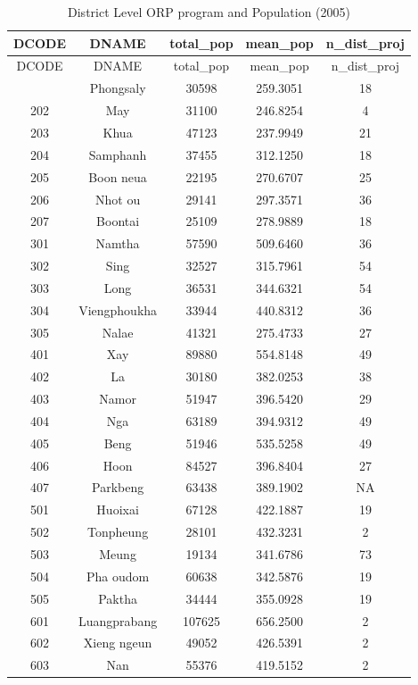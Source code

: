\documentclass[
  letterpaper,
  DIV=11,
  numbers=noendperiod]{scrartcl}
\begin{document}
\begin{longtable}[]{@{}ccccc@{}}
\caption{District Level ORP program and Population
(2005)}\tabularnewline
\toprule\noalign{}
DCODE & DNAME & total\_pop & mean\_pop & n\_dist\_proj \\
\midrule\noalign{}
\endfirsthead
\toprule\noalign{}
DCODE & DNAME & total\_pop & mean\_pop & n\_dist\_proj \\
\midrule\noalign{}
\endhead
\bottomrule\noalign{}
\endlastfoot
201 & Phongsaly & 30598 & 259.3051 & 18 \\
202 & May & 31100 & 246.8254 & 4 \\
203 & Khua & 47123 & 237.9949 & 21 \\
204 & Samphanh & 37455 & 312.1250 & 18 \\
205 & Boon neua & 22195 & 270.6707 & 25 \\
206 & Nhot ou & 29141 & 297.3571 & 36 \\
207 & Boontai & 25109 & 278.9889 & 18 \\
301 & Namtha & 57590 & 509.6460 & 36 \\
302 & Sing & 32527 & 315.7961 & 54 \\
303 & Long & 36531 & 344.6321 & 54 \\
304 & Viengphoukha & 33944 & 440.8312 & 36 \\
305 & Nalae & 41321 & 275.4733 & 27 \\
401 & Xay & 89880 & 554.8148 & 49 \\
402 & La & 30180 & 382.0253 & 38 \\
403 & Namor & 51947 & 396.5420 & 29 \\
404 & Nga & 63189 & 394.9312 & 49 \\
405 & Beng & 51946 & 535.5258 & 49 \\
406 & Hoon & 84527 & 396.8404 & 27 \\
407 & Parkbeng & 63438 & 389.1902 & NA \\
501 & Huoixai & 67128 & 422.1887 & 19 \\
502 & Tonpheung & 28101 & 432.3231 & 2 \\
503 & Meung & 19134 & 341.6786 & 73 \\
504 & Pha oudom & 60638 & 342.5876 & 19 \\
505 & Paktha & 34444 & 355.0928 & 19 \\
601 & Luangprabang & 107625 & 656.2500 & 2 \\
602 & Xieng ngeun & 49052 & 426.5391 & 2 \\
603 & Nan & 55376 & 419.5152 & 2 \\

\end{longtable}
\end{document}
